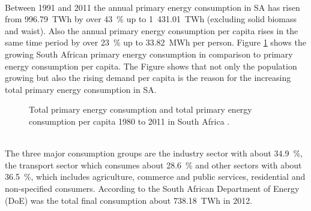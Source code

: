 \documentclass[Master,MEE,english]{twbook}%
\begin{document}
%
\\
Between 1991 and 2011 the annual primary energy consumption in SA has risen from 996.79~TWh by over 43~\% up to 1~431.01~TWh (excluding solid biomass and waist). Also the annual primary energy consumption per capita rises in the same time period by over 23~\% up to 33.82~MWh per person. Figure \ref{PEV} shows the growing South African primary energy consumption in comparison to primary energy consumption per capita. The Figure shows that not only the population growing but also the rising demand per capita is the reason for the increasing total primary energy consumption in SA.  \cite{BP2014b}
\begin{figure}[htb] %
  \centering
  \caption[Total primary energy consumption and total primary energy consumption per capita 1980 to 2011 in South Africa. ]{Total primary energy consumption and total primary energy consumption per capita 1980 to 2011 in South Africa \cite{BP2014b,EIA2015}.}\label{PEV}
\end{figure}\\
The three major consumption groups are the industry sector with about 34.9~\%, the transport sector which consumes about 28.6~\% and other sectors with about 36.5~\%, which includes agriculture, commerce and public services, residential and non-specified consumers. According to the South African Department of Energy (DoE) was the total final consumption about 738.18~TWh in 2012. \cite{DepartmentofEnergy2012}
\pagebreak
\end{document}
